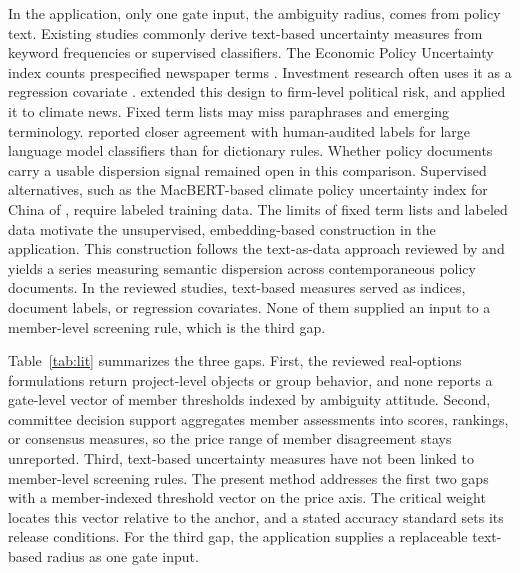 \documentclass[5p,times,authoryear]{elsarticle}
\theoremstyle{plain}
\begin{document}
In the application, only one gate input, the ambiguity radius, comes from policy text. Existing studies commonly derive text-based uncertainty measures from keyword frequencies or supervised classifiers. The Economic Policy Uncertainty index counts prespecified newspaper terms \citep{Baker2016}. Investment research often uses it as a regression covariate \citep{GulenIon2016}. \citet{Hassan2019} extended this design to firm-level political risk, and \citet{Gavriilidis2021} applied it to climate news. Fixed term lists may miss paraphrases and emerging terminology. \citet{Hartley2025} reported closer agreement with human-audited labels for large language model classifiers than for dictionary rules. Whether policy documents carry a usable dispersion signal remained open in this comparison. Supervised alternatives, such as the MacBERT-based climate policy uncertainty index for China of \citet{Ma2023}, require labeled training data. The limits of fixed term lists and labeled data motivate the unsupervised, embedding-based construction in the application. This construction follows the text-as-data approach reviewed by \citet{Gentzkow2019} and yields a series measuring semantic dispersion across contemporaneous policy documents. In the reviewed studies, text-based measures served as indices, document labels, or regression covariates. None of them supplied an input to a member-level screening rule, which is the third gap.

Table~\ref{tab:lit} summarizes the three gaps. First, the reviewed real-options formulations return project-level objects or group behavior, and none reports a gate-level vector of member thresholds indexed by ambiguity attitude. Second, committee decision support aggregates member assessments into scores, rankings, or consensus measures, so the price range of member disagreement stays unreported. Third, text-based uncertainty measures have not been linked to member-level screening rules. The present method addresses the first two gaps with a member-indexed threshold vector on the price axis. The critical weight locates this vector relative to the anchor, and a stated accuracy standard sets its release conditions. For the third gap, the application supplies a replaceable text-based radius as one gate input.
\end{document}
